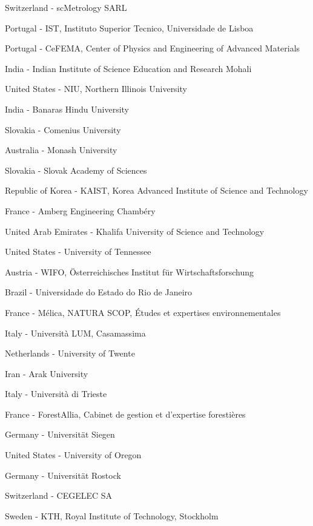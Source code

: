 \item[$^{388}$] Switzerland - scMetrology SARL
\item[$^{389}$] Portugal - IST, Instituto Superior Tecnico, Universidade de Lisboa
\item[$^{390}$] Portugal - CeFEMA, Center of Physics and Engineering of Advanced Materials
\item[$^{391}$] India - Indian Institute of Science Education and Research Mohali
\item[$^{392}$] United States - NIU, Northern Illinois University
\item[$^{393}$] India - Banaras Hindu University
\item[$^{394}$] Slovakia - Comenius University
\item[$^{395}$] Australia - Monash University
\item[$^{396}$] Slovakia - Slovak Academy of Sciences
\item[$^{397}$] Republic of Korea - KAIST, Korea Advanced Institute of Science and Technology
\item[$^{398}$] France - Amberg Engineering Chamb{\'e}ry
\item[$^{399}$] United Arab Emirates - Khalifa University of Science and Technology
\item[$^{400}$] United States - University of Tennessee
\item[$^{401}$] Austria - WIFO, {\"O}sterreichisches Institut f{\"u}r Wirtschaftsforschung
\item[$^{402}$] Brazil - Universidade do Estado do Rio de Janeiro
\item[$^{403}$] France - M{\'e}lica, NATURA SCOP, {\'E}tudes et expertises environnementales
\item[$^{404}$] Italy - Universit{\`a} LUM, Casamassima
\item[$^{405}$] Netherlands - University of Twente
\item[$^{406}$] Iran - Arak University
\item[$^{407}$] Italy - Universit{\`a} di Trieste
\item[$^{408}$] France - ForestAllia, Cabinet de gestion et d'expertise foresti{\`e}res
\item[$^{409}$] Germany - Universit{\"a}t Siegen
\item[$^{410}$] United States - University of Oregon
\item[$^{411}$] Germany - Universit{\"a}t Rostock
\item[$^{412}$] Switzerland - CEGELEC SA
\item[$^{413}$] Sweden - KTH, Royal Institute of Technology, Stockholm
